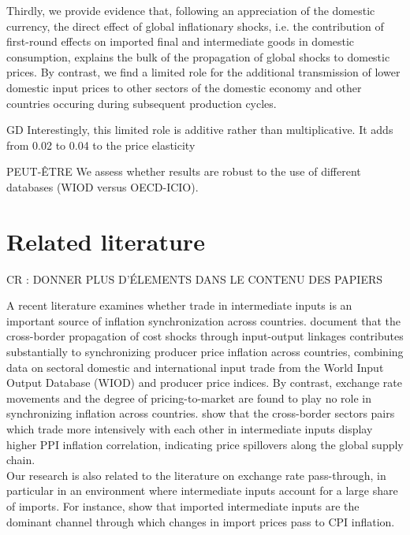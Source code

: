 \documentclass[11pt,a4paper]{article}
\begin{document}
Thirdly, we provide evidence that, following an appreciation of the domestic currency, the direct effect of global inflationary shocks, i.e. the contribution of first-round effects on imported final and intermediate goods in domestic consumption, explains the bulk of the propagation of global shocks to domestic prices. By contrast, we find a limited role for the additional transmission of lower domestic input prices to other sectors of the domestic economy and other countries occuring during subsequent production cycles.


GD Interestingly, this limited role is additive rather than multiplicative. It adds from 0.02 to 0.04 to the price elasticity

PEUT-ÊTRE We assess whether results are robust to the use of different databases (WIOD versus OECD-ICIO). 


\label{sec:intro}


\section{Related literature}
\label{sec:lit}

CR : DONNER PLUS D'ÉLEMENTS DANS LE CONTENU DES PAPIERS

A recent literature examines whether trade in intermediate inputs is an important source of inflation synchronization across countries.
\cite{Auer2017} document that the cross-border propagation of cost shocks through input-output
linkages contributes substantially to synchronizing producer price inflation across countries, combining data on sectoral domestic and international input trade from the World Input Output
Database (WIOD) and producer price indices. By contrast, exchange rate movements and the degree of pricing-to-market are found to play no role in synchronizing inflation across countries.
\cite{AntoundeAlmeida2016} show that the cross-border sectors pairs which trade more intensively with each other in intermediate inputs display higher PPI inflation correlation, indicating  price spillovers along the global supply chain.\\

Our research is also related to the literature on exchange rate pass-through, in particular in an environment where intermediate inputs account for a large share of imports. For instance,  \cite{Goldberg2010} show that imported intermediate inputs are the dominant channel through which changes in import prices pass to CPI inflation.\\
\end{document}

